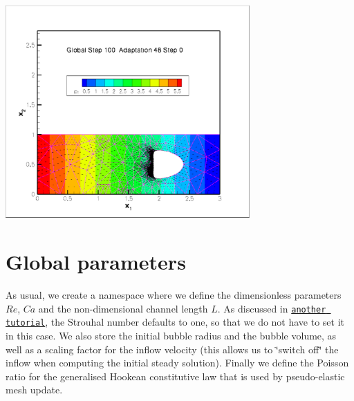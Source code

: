  
\begin{DoxyImage}
\includegraphics[width=0.7\textwidth]{tutorial}
\end{DoxyImage}




 

\hypertarget{index_parameters}{}\section{Global parameters}\label{index_parameters}
As usual, we create a namespace where we define the dimensionless parameters $ Re $, $ Ca $ and the non-\/dimensional channel length $ L $. As discussed in \href{../../driven_cavity/html/index.html#params}{\tt another tutorial}, the Strouhal number defaults to one, so that we do not have to set it in this case. We also store the initial bubble radius and the bubble volume, as well as a scaling factor for the inflow velocity (this allows us to \char`\"{}switch off\char`\"{} the inflow when computing the initial steady solution). Finally we define the Poisson ratio for the generalised Hookean constitutive law that is used by pseudo-\/elastic mesh update.

